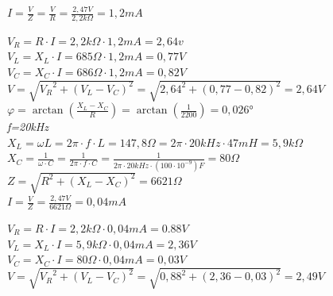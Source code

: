 \documentclass[12pt]{article}
\begin{document}
\begin{center}
\vspace{5mm}
$I=\frac{V}{Z}=\frac{V}{R}=\frac{2,47V}{2,2k\Omega}=1,2mA$\\

\vspace{5mm}

$V_R=R\cdot I=2,2k\Omega \cdot 1,2mA=2,64v$\\
$V_L=X_L\cdot I=685 \Omega \cdot 1,2mA=0,77V$\\
$V_C=X_C\cdot I=686 \Omega\cdot 1,2mA=0,82V$\\
$V=\sqrt{{V_R}^2+(V_L-V_C)^2}=\sqrt{2,64^2+(0,77-0,82)^2}=2,64V$\\
\vspace{5mm}
$\varphi=\arctan(\frac{X_L - X_C}{R})= \arctan (\frac{1}{2200})=0,026$°\\ 
\vspace{10mm}
\textit{f=20kHz}\\
\vspace{5mm}
$X_L=\omega L=2 \pi\cdot f \cdot L=147,8 \Omega=2 \pi\cdot 20kHz \cdot 47mH=5,9 k\Omega$\\
$X_C=\frac{1}{\omega \cdot C}=\frac{1}{2 \pi\cdot f  \cdot C}=\frac{1}{2 \pi\cdot 20kHz  \cdot (100 \cdot 10^{-9})F}=80 \Omega$\\
$Z=\sqrt{R^2+(X_L-X_C)^2}=6621\Omega$\\


\vspace{5mm}
$I=\frac{V}{Z}=\frac{2,47V}{6621\Omega}=0,04mA$\\

\vspace{5mm}

$V_R=R\cdot I=2,2k\Omega \cdot 0,04mA=0.88V$\\
$V_L=X_L\cdot I=5,9 k\Omega \cdot 0,04mA=2,36V$\\
$V_C=X_C\cdot I= 80\Omega\cdot 0,04mA=0,03V$\\
$V=\sqrt{{V_R}^2+(V_L-V_C)^2}=\sqrt{0,88^2+(2,36-0,03)^2}=2,49V$\\


\end{center}
\end{document}

